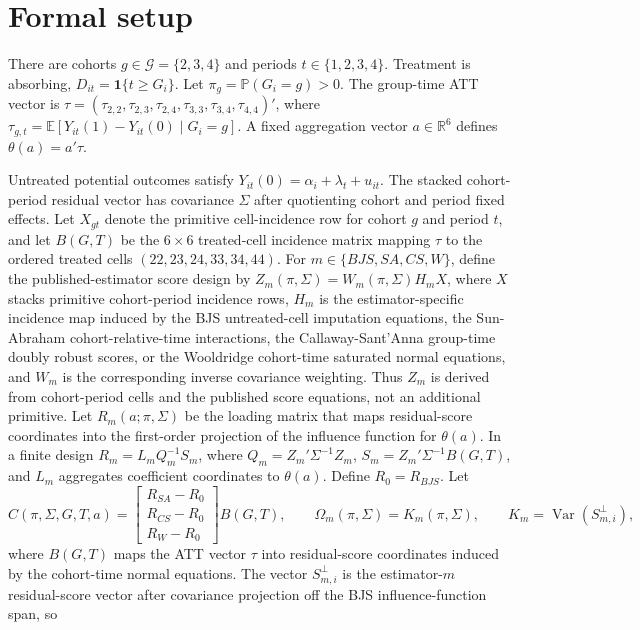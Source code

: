 \documentclass[11pt]{article}
\newcommand{\E}{\mathbb{E}}
\renewcommand{\Pr}{\mathbb{P}}
\newcommand{\one}{\mathbf{1}}
\theoremstyle{definition}
\theoremstyle{plain}
\theoremstyle{remark}
\begin{document}
\section{Formal setup}
There are cohorts \(g\in\mathcal G=\{2,3,4\}\) and periods \(t\in\{1,2,3,4\}\). Treatment is absorbing, \(D_{it}=\one\{t\ge G_i\}\). Let \(\pi_g=\Pr(G_i=g)>0\). The group-time ATT vector is \(\tau=(\tau_{2,2},\tau_{2,3},\tau_{2,4},\tau_{3,3},\tau_{3,4},\tau_{4,4})'\), where \(\tau_{g,t}=\E[Y_{it}(1)-Y_{it}(0)\mid G_i=g]\). A fixed aggregation vector \(a\in\mathbb R^6\) defines \(\theta(a)=a'\tau\).

Untreated potential outcomes satisfy \(Y_{it}(0)=\alpha_i+\lambda_t+u_{it}\). The stacked cohort-period residual vector has covariance \(\Sigma\) after quotienting cohort and period fixed effects. Let \(X_{gt}\) denote the primitive cell-incidence row for cohort \(g\) and period \(t\), and let \(B(G,T)\) be the \(6\times 6\) treated-cell incidence matrix mapping \(\tau\) to the ordered treated cells \((22,23,24,33,34,44)\). For \(m\in\{BJS,SA,CS,W\}\), define the published-estimator score design by \(Z_m(\pi,\Sigma)=W_m(\pi,\Sigma)H_mX\), where \(X\) stacks primitive cohort-period incidence rows, \(H_m\) is the estimator-specific incidence map induced by the BJS untreated-cell imputation equations, the Sun-Abraham cohort-relative-time interactions, the Callaway-Sant'Anna group-time doubly robust scores, or the Wooldridge cohort-time saturated normal equations, and \(W_m\) is the corresponding inverse covariance weighting. Thus \(Z_m\) is derived from cohort-period cells and the published score equations, not an additional primitive. Let \(R_m(a;\pi,\Sigma)\) be the loading matrix that maps residual-score coordinates into the first-order projection of the influence function for \(\theta(a)\). In a finite design \(R_m=L_mQ_m^{-1}S_m\), where \(Q_m=Z_m'\Sigma^{-1}Z_m\), \(S_m=Z_m'\Sigma^{-1}B(G,T)\), and \(L_m\) aggregates coefficient coordinates to \(\theta(a)\). Define \(R_0=R_{BJS}\). Let
\[
C(\pi,\Sigma,G,T,a)=\begin{bmatrix}R_{SA}-R_0\\ R_{CS}-R_0\\ R_W-R_0\end{bmatrix}B(G,T),\qquad
\Omega_m(\pi,\Sigma)=K_m(\pi,\Sigma),\qquad
K_m=\operatorname{Var}(S_{m,i}^{\perp}),
\]
where \(B(G,T)\) maps the ATT vector \(\tau\) into residual-score coordinates induced by the cohort-time normal equations. The vector \(S_{m,i}^{\perp}\) is the estimator-\(m\) residual-score vector after covariance projection off the BJS influence-function span, so
\end{document}
